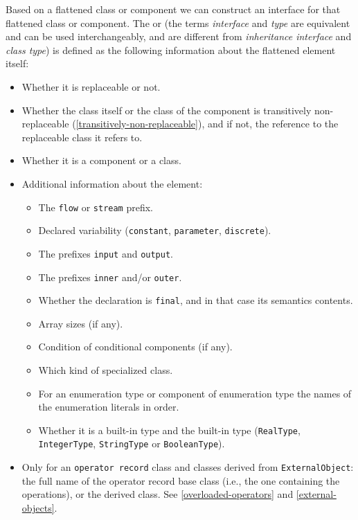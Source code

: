 Based on a flattened class or component we can construct an interface for that flattened class or component.
The  or  (the terms \emph{interface} and \emph{type} are equivalent and can be used interchangeably, and are different from \emph{inheritance interface} and \emph{class type}) is defined as the following information about the flattened element itself:
\begin{itemize}
\item
  Whether it is replaceable or not.
\item
  Whether the class itself or the class of the component is transitively non-replaceable (\cref{transitively-non-replaceable}), and if not, the reference to the replaceable class it refers to.
\item
  Whether it is a component or a class.
\item
  Additional information about the element:
  \begin{itemize}
  \item
    The \lstinline!flow! or \lstinline!stream! prefix.
  \item
    Declared variability (\lstinline!constant!, \lstinline!parameter!, \lstinline!discrete!).
  \item
    The prefixes \lstinline!input! and \lstinline!output!.
  \item
    The prefixes \lstinline!inner! and/or \lstinline!outer!.
  \item
    Whether the declaration is \lstinline!final!, and in that case its semantics contents.
  \item
    Array sizes (if any).
  \item
    Condition of conditional components (if any).
  \item
    Which kind of specialized class.
  \item
    For an enumeration type or component of enumeration type the names of the enumeration literals in order.
  \item
    Whether it is a built-in type and the built-in type (\lstinline!RealType!, \lstinline!IntegerType!, \lstinline!StringType! or \lstinline!BooleanType!).
  \end{itemize}
\item
  Only for an \lstinline!operator record! class and classes derived from \lstinline!ExternalObject!: the full name of the operator record base class (i.e., the one containing the operations), or the derived class.
  See \cref{overloaded-operators} and \cref{external-objects}.


\end{itemize}
